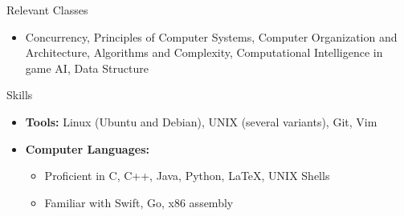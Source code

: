 \documentclass[11pt,oneside]{article}
\newenvironment{ressection}[1]{
	\vspace{4pt}
	{\fontfamily{phv}\selectfont\Large#1}
	\begin{itemize}
	\vspace{3pt}
}{
	\end{itemize}
}
\newcommand{\resitem}[1]{
	\vspace{-4pt}
	\item \begin{flushleft} #1 \end{flushleft}
}
\newcommand{\ressubitem}[1]{
	\vspace{-1pt}
	\item \begin{flushleft} #1 \end{flushleft}
}
\newenvironment{reslist}[1]{
	\resitem{\textbf{#1}}
	\vspace{-5pt}
	\begin{itemize}
}{
	\end{itemize}
}
\begin{document}
\begin{ressection}{Relevant Classes}

	\resitem{Concurrency, Principles of Computer Systems, Computer Organization and Architecture, Algorithms and Complexity, Computational Intelligence in game AI, Data Structure}
\end{ressection}

\begin{ressection}{Skills}

	\resitem{\textbf{Tools:} Linux (Ubuntu and Debian), UNIX (several variants), Git, Vim}

	\begin{reslist}{Computer Languages:}

		\ressubitem{Proficient in C, C++, Java, Python, \LaTeX, UNIX Shells}

		\ressubitem{Familiar with Swift, Go, x86 assembly}

	\end{reslist}


\end{ressection}


\end{document}
